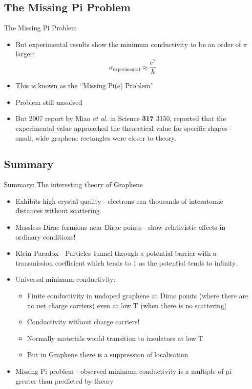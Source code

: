 \documentclass{beamer}
\begin{document}
\subsection{The Missing Pi Problem}
\begin{frame}[t]{The Missing Pi Problem}
\begin{itemize}
\item But experimental results show the minimum conductivity to be an order of $\pi$ larger:
\begin{equation}
\sigma_{\text{experimental}} \approx \frac{e^2}{\hbar}
\end{equation}
\item This is known as the ``Missing Pi(e) Problem"
\item Problem still unsolved
\item But 2007 report by Miao \textit{et al.} in Science \textbf{317} 3150, reported that the experimental value approached the theoretical value for specific shapes - small, wide graphene rectangles were closer to theory.
\end{itemize}
\end{frame}


\subsection{Summary}
\begin{frame}[t]{Summary: The interesting theory of Graphene}
\begin{itemize}
\item Exhibits high crystal quality - electrons can thousands of interatomic distances without scattering.
\item Massless Dirac fermions near Dirac points - show relativistic effects in ordinary conditions!
\item Klein Paradox - Particles tunnel through a potential barrier with a transmission coefficient which tends to 1 as the potential tends to infinity.
\item Universal minimum conductivity:
\begin{itemize}
\item Finite conductivity in undoped graphene at Dirac points (where there are no net charge carriers) even at low T (when there is no scattering)
\item Conductivity without charge carriers!
\item Normally materials would transition to insulators at low T
\item But in Graphene there is a suppression of localisation
\end{itemize}
\item Missing Pi problem - observed minimum conductivity is a multiple of pi greater than predicted by theory
\end{itemize}
\end{frame}
\end{document}
